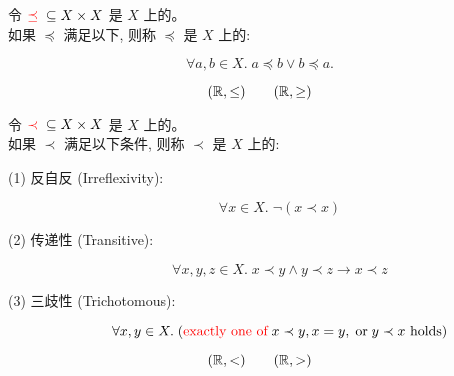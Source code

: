 
\begin{frame}{}
  \begin{definition}
    令 $\textcolor{red}{\preceq} \;\subseteq X \times X$ 是 $X$ 上的。\\[5pt]
    如果 $\preceq$ 满足以下, 则称 $\preceq$ 是 $X$ 上的:

    \[
      \forall a, b \in X.\; a \preceq b \lor b \preceq a.
    \]
  \end{definition}

  \[
    (\mathbb{R}, \le) \qquad (\mathbb{R}, \ge)
  \]
\end{frame}

\begin{frame}{}
  \begin{definition}
    令 $\textcolor{red}{\prec} \;\subseteq X \times X$ 是 $X$ 上的。\\[3pt]
    如果 $\prec$ 满足以下条件, 则称 $\prec$ 是 $X$ 上的: \\[6pt]
    \begin{description}
      \item[(1) 反自反 (Irreflexivity):]
        \[
          \forall x \in X.\; \lnot (x \prec x)
        \]
      \item[(2) 传递性 (Transitive):]
        \[
          \forall x, y, z \in X.\; x \prec y \land y \prec z \to x \prec z
        \]
      \item[(3) 三歧性 (Trichotomous):]
        \[
          \forall x, y \in X.\;
            (\text{\textcolor{red}{exactly one of}}\; x \prec y, x = y, \;\text{or}\; y \prec x \text{ holds})
        \]
    \end{description}
  \end{definition}

  \[
    (\mathbb{R}, <) \qquad (\mathbb{R}, >)
  \]
\end{frame}
